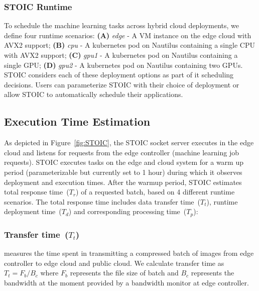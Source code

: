  \BlankLine
 \subsubsection{STOIC Runtime}
 To schedule the machine learning tasks across hybrid cloud deployments,
we define four runtime scenarios: \textbf{(A)} \textit{edge} - A VM instance on the edge cloud with AVX2 support; \textbf{(B)} \textit{cpu} - A kubernetes pod on Nautilus containing a single CPU with AVX2 support; \textbf{(C)} \textit{gpu1} - A kubernetes pod on Nautilus containing a single GPU; \textbf{(D)} \textit{gpu2} - A kubernetes pod on Nautilus containing two GPUs. STOIC considers
each of these deployment options as part of it scheduling decisions.
Users can parameterize STOIC with their choice of deployment or allow 
STOIC to automatically schedule their applications.
 
 
 
 \subsection{Execution Time Estimation}
 As depicted in Figure~\ref{fig:STOIC}, the STOIC socket server executes 
in the edge cloud and listens for requests from the
edge controller (machine learning job requests).  STOIC executes tasks
on the edge and cloud system for a warm up period (parameterizable but
currently set to 1 hour) during which it observes deployment and execution 
times.  After the warmup period, STOIC estimates total 
response time~($T_r$) of a requested batch, based on 4 different runtime scenarios. The total response time includes data transfer time~($T_t$), runtime deployment time~($T_d$) and corresponding processing time~($T_p$): 
 
 \subsubsection{Transfer time~($T_t$)} measures the time spent in transmitting a compressed batch of images from edge controller to edge cloud and public cloud. We calculate transfer time as ${T_t = F_b / B_c}$ where $F_b$ represents the file size of batch and $B_c$ represents the bandwidth at the moment provided by a bandwidth monitor at edge controller. 
 
